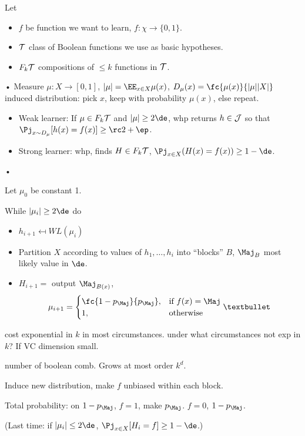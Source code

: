 Let
\begin{itemize}
\item
$f$ be function we want to learn, $f:\chi\to \{0,1\}$.
\item
$\cal T$ class of Boolean functions we use as basic hypotheses.
\item
$F_k\cal T$ compositions of $\le k$ functions in $\cal T$.
\end{itemize}•
Measure $\mu:X\to [0,1]$, $|\mu|=\EE_{x\in X}\mu(x)$, $D_\mu(x)=\fc{\mu(x)}{|\mu||X|}$ induced distribution: pick $x$, keep with probability $\mu(x)$, else repeat. 


\begin{itemize}
\item
Weak learner: If $\mu\in F_k\cal T$ and $|\mu|\ge 2\de$, whp returns $h\in \cal J$ so that $\Pj_{x\sim D_\mu}[h(x) = f(x)] \ge \rc2+\ep$.
\item
Strong learner: whp, finds $H\in F_k \cal T$, $\Pj_{x\in X} (H(x) = f(x)) \ge 1-\de$. 
\end{itemize}•

Let $\mu_0$ be constant 1. 

While $|\mu_i|\ge 2\de$ do
\begin{itemize}
\item
$h_{i+1}\mapsfrom WL(\mu_i)$
\item
Partition $X$ according to values of $h_1,\ldots,h_i$
into ``blocks'' $B$, $\Maj_B$ most likely value in $\de$.
%
\item
$H_{i+1}=$ output $\Maj_{B(x)}$, $$\mu_{i+1} = \begin{cases}
\fc{1-p_{\Maj}}{p_{\Maj}},&\text{if } f(x)=\Maj\\
1,&\text{otherwise}
\end{cases}• $$
\end{itemize}
cost exponential in $k$ in most circumstances. under what circumstances not exp in $k$? If VC dimension small.

number of boolean comb. Grows at most order $k^d$.

Induce new distribution, make $f$ unbiased within each block. 

Total probability: on $1-p_{\Maj}$, $f=1$, make $p_{\Maj}$. $f=0$, $1-p_{\Maj}$.

(Last time: if $|\mu_i|\le 2\de$, $\Pj_{x\in X}[H_i=f]\ge 1-\de$.)

